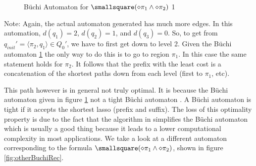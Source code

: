 \begin{figure}
\centering
{}
\caption{B\"uchi Automaton for $\smallsquare(\diamond \pi_1 \land \diamond \pi_2 )$ 1}
\label{fig:gasBuchiRec}
\end{figure}
Note: Again, the actual automaton generated has much more edges. %
In this automation, $d(q_1)=2$, $d(q_2)=1$, and $d(q_3)=0$. So, to get from $q_{init}' = \langle \pi_2, q_1 \rangle \in Q_0'$, we have to first get down to level 2. Given the B\"{u}chi automaton \ref{fig:gasBuchiRec} the only way to do this is to go to region $\pi_1$.  In this case the same statement holds for $\pi_2$. It follows that the prefix with the least cost is a concatenation of the shortest paths down from each level (first to $\pi_1$, etc).


This path however is in general not truly optimal. It is because the B\"{u}chi automaton given in figure \ref{fig:gasBuchiRec} not a tight B\"{u}chi automaton \cite{schuppan05}. A B\"{u}chi automaton is tight if it accepts the shortest lasso (prefix and suffix). The loss of this optimality property is due to the fact that the algorithm in \cite{gastin01} simplifies the B\"{u}chi automaton which is usually a good thing because it leads to a lower computational complexity in most applications. We take a look at a different automaton corresponding to the formula $\smallsquare(\diamond \pi_1 \land \diamond \pi_2)$, shown in figure \ref{fig:otherBuchiRec}. 


